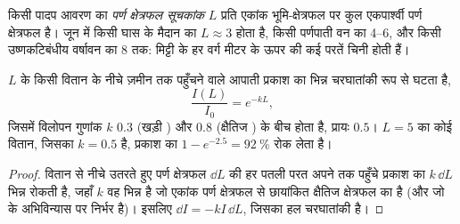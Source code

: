 \begin{definition}[पर्ण क्षेत्रफल सूचकांक]\label{def:b1:flowering-plant-organization:lai}
किसी पादप आवरण का \emph{पर्ण क्षेत्रफल सूचकांक} $L$
प्रति एकांक भूमि-क्षेत्रफल पर कुल एकपार्श्वी पर्ण क्षेत्रफल है। जून में
किसी घास के मैदान का $L \approx 3$ होता है, किसी पर्णपाती वन का
\qtyrange{4}{6}{}, और किसी उष्णकटिबंधीय वर्षावन का \qty{8}{} तक: मिट्टी
के हर वर्ग मीटर के ऊपर  की कई परतें चिनी होती हैं।
\end{definition}

\begin{proposition}[किसी वितान द्वारा प्रकाश का अवरोधन]\label{prop:b1:flowering-plant-organization:beer}
 $L$ के किसी वितान के नीचे ज़मीन तक पहुँचने वाले
आपाती प्रकाश का भिन्न चरघातांकी रूप से घटता है,
\[
\frac{I(L)}{I_0} = e^{-kL},
\]
जिसमें विलोपन गुणांक $k$ $0.3$ (खड़ी ) और $0.8$ (क्षैतिज
) के बीच होता है, प्रायः $0.5$। $L = 5$ का कोई वितान, जिसका
$k = 0.5$ है, प्रकाश का $1 - e^{-2.5} = \qty{92}{\%}$ रोक लेता है।
\end{proposition}
\begin{proof}
वितान से नीचे उतरते हुए पर्ण क्षेत्रफल $\dd L$ की हर पतली परत अपने तक
पहुँचे प्रकाश का $k\,\dd L$ भिन्न रोकती है, जहाँ $k$ वह भिन्न है जो
एकांक पर्ण क्षेत्रफल से छायांकित क्षैतिज क्षेत्रफल का है (और जो 
के अभिविन्यास पर निर्भर है)। इसलिए $\dd I = -kI\,\dd L$, जिसका हल
चरघातांकी है।
\end{proof}

